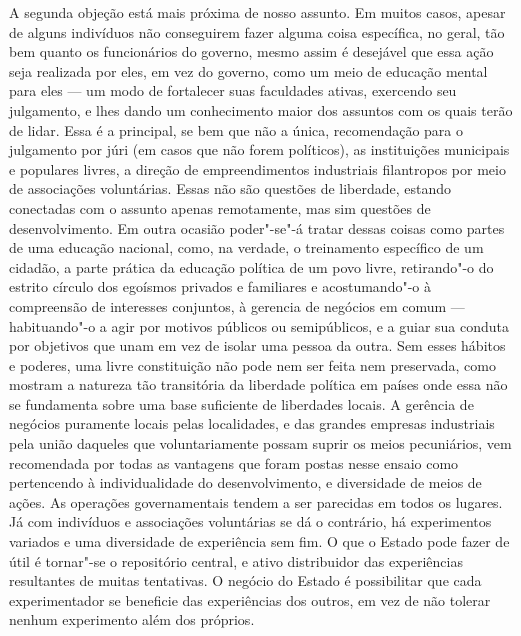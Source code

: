 A segunda objeção está mais próxima de nosso assunto. Em muitos casos,
apesar de alguns indivíduos não conseguirem fazer alguma coisa
específica, no geral, tão bem quanto os funcionários do governo, mesmo
assim é desejável que essa ação seja realizada por eles, em vez do
governo, como um meio de educação mental para eles --- um modo de
fortalecer suas faculdades ativas, exercendo seu julgamento, e lhes
dando um conhecimento maior dos assuntos com os quais terão de
lidar. Essa é a principal, se bem que não a única, recomendação para o
julgamento por júri (em casos que não forem políticos), as
instituições municipais e populares livres, a direção de
empreendimentos industriais filantropos por meio de associações
voluntárias. Essas não são questões de liberdade, estando conectadas
com o assunto apenas remotamente, mas sim questões de desenvolvimento.
Em outra ocasião poder"-se"-á tratar dessas coisas
como partes de uma educação nacional, como, na verdade, o
treinamento específico de um cidadão, a parte prática da educação
política de um povo livre, retirando"-o do estrito círculo dos
egoísmos privados e familiares e acostumando"-o à compreensão de
interesses conjuntos, à gerencia de negócios em comum --- habituando"-o a
agir por motivos públicos ou semipúblicos, e a guiar sua conduta por
objetivos que unam em vez de isolar uma pessoa da outra. Sem esses
hábitos e poderes, uma livre constituição não pode nem ser feita nem
preservada, como mostram a natureza tão transitória da liberdade
política em países onde essa não se fundamenta sobre uma base
suficiente de liberdades locais. A gerência de negócios puramente
locais pelas localidades, e das grandes empresas industriais pela união
daqueles que voluntariamente possam suprir os meios pecuniários, vem
recomendada por todas as vantagens que foram postas nesse ensaio como
pertencendo à individualidade do desenvolvimento, e diversidade de
meios de ações. As operações governamentais tendem a ser parecidas em
todos os lugares. Já com indivíduos e associações voluntárias se dá o
contrário, há experimentos variados e uma diversidade de experiência
sem fim. O que o Estado pode fazer de útil é tornar"-se o repositório
central, e ativo distribuidor das experiências
resultantes de muitas tentativas. O negócio do Estado é possibilitar
que cada experimentador se beneficie das experiências dos outros,
em vez de não tolerar nenhum experimento além dos próprios.

